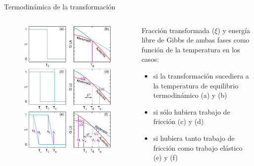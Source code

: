 \documentclass[11pt]{beamer}
\begin{document}
		\begin{frame}{Termodinámica de la transformación}
			\begin{columns}[T] %
				\begin{column}{.4\textwidth}
					\begin{figure}
						\includegraphics[scale=0.2]{img/Termo.eps}
					\end{figure}
				\end{column}
				\hfill
				\begin{column}{.59\textwidth}
				Fracción transformada ($\xi$) y energía libre de Gibbs de ambas fases como función de la temperatura en los casos: 
					\begin{itemize}
						\item si la transformación sucediera a la temperatura de equilibrio termodinámico (a) y (b)
						\item si sólo hubiera trabajo de fricción (c) y (d)
						\item si hubiera tanto trabajo de fricción como trabajo elástico (e) y (f)
					\end{itemize}
				\end{column}
			\end{columns}
		\end{frame}
		
\end{document}
